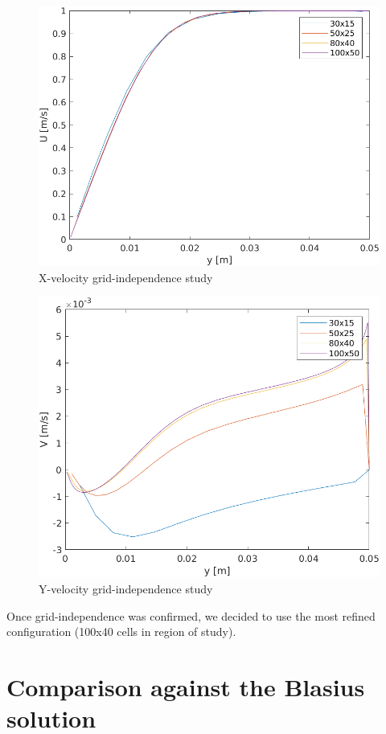 \documentclass[12pt]{article}
\begin{document}
        \begin{figure}[ht!]
                \centering
                \includegraphics[width=\textwidth]{u_independence.png}
                \caption{X-velocity grid-independence study}
                \label{fig:u_ind}
        \end{figure}

        \begin{figure}[ht!]
                \centering
                \includegraphics[width=\textwidth]{v_independence.png}
                \caption{Y-velocity grid-independence study}
                \label{fig:v_ind}
        \end{figure}

        Once grid-independence was confirmed, we decided to use the most refined configuration (100x40 cells in region of study).

\section{Comparison against the Blasius solution} \label{sec:comparison}

        



\end{document}
